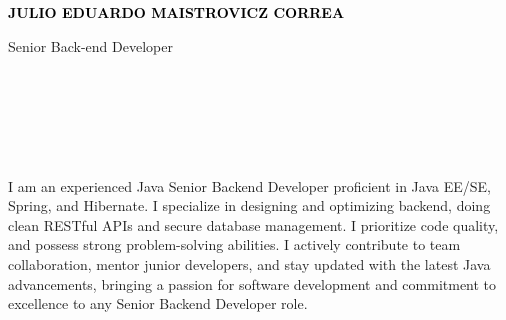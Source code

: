 \documentclass[9pt]{developercv} %
\begin{document}

\begin{minipage}[t]{0.5\textwidth} 
	\vspace{-\baselineskip} %
	
	{ \fontsize{16}{20} \textcolor{black}{\textbf{\MakeUppercase{Julio Eduardo Maistrovicz Correa}}}} %
	
	\vspace{6pt}
	
	{\Large Senior Back-end Developer } %
\end{minipage}
\hfill
\begin{minipage}[t]{0.2\textwidth} %
	\vspace{-\baselineskip} %
	
    \\
    \\
	
\end{minipage}
\begin{minipage}[t]{0.27\textwidth} %
	\vspace{-\baselineskip} %
	
	\\	
    \\    
    
\end{minipage}
\begin{minipage}[t]{0.46\textwidth}
	\vspace{-6pt}
 
    I am an experienced Java Senior Backend Developer proficient in Java EE/SE, Spring, and Hibernate. I specialize in designing and optimizing backend, doing clean RESTful APIs and secure database management. I prioritize code quality, and possess strong problem-solving abilities. I actively contribute to team collaboration, mentor junior developers, and stay updated with the latest Java advancements, bringing a passion for software development and commitment to excellence to any Senior Backend Developer role.
\end{minipage}
\end{document}
